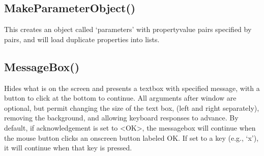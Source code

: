 \documentclass[letterpaper,10pt,english]{sphinxmanual}
\begin{document}
\subsection{MakeParameterObject()}
\label{\detokenize{reference/utility:makeparameterobject}}\label{\detokenize{reference/utility:index-27}}
\sphinxAtStartPar
{}

\sphinxAtStartPar
This creates an object called ‘parameters’ with
property\sphinxhyphen{}value pairs specified by pairs, and
will load duplicate properties into lists.

\sphinxAtStartPar
{}

\begin{sphinxVerbatim}[commandchars=\\\{\}]
\end{sphinxVerbatim}

\ignorespaces 

\subsection{MessageBox()}
\label{\detokenize{reference/utility:messagebox}}\label{\detokenize{reference/utility:index-28}}
\sphinxAtStartPar
{}

\sphinxAtStartPar
{}

\sphinxAtStartPar
Hides what is on the screen and presents a textbox with   specified message, with a button to click at the bottom to continue.   All arguments after window are optional, but permit changing the size of the text box, (left and right separately), removing the background, and allowing keyboard responses to advance.    By default, if acknowledgement is set to \textless{}OK\textgreater{}, the messagebox will continue when the mouse button clicks   an on\sphinxhyphen{}screen button labeled OK. If set to a key (e.g., ‘x’), it will continue when that key is pressed.

\sphinxAtStartPar
{}

\begin{sphinxVerbatim}[commandchars=\\\{\}]
\end{sphinxVerbatim}
\end{document}
